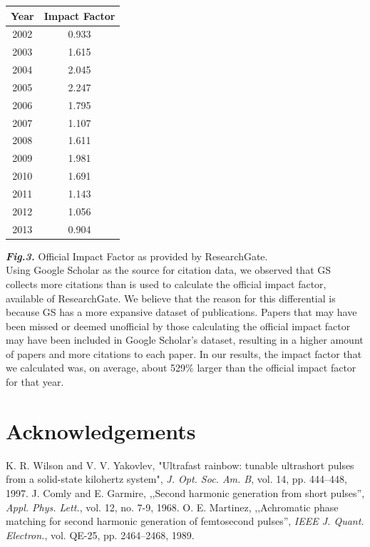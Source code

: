 \documentclass[times]{jtitauth}
\begin{document}
\begin{center}
\begin{tabular}{| c | c |} 
 \hline
 Year & Impact Factor\\ 
 \hline\hline
 2002 &  0.933\\ 
 \hline
 2003 &  1.615\\
 \hline
 2004 &  2.045\\
 \hline
 2005 &  2.247\\
 \hline
 2006 &  1.795\\ 
 \hline
 2007 &  1.107\\ 
 \hline
 2008 &  1.611\\ 
 \hline
 2009 &  1.981\\ 
 \hline
 2010 &  1.691\\ 
 \hline
 2011 &  1.143\\ 
 \hline
 2012 &  1.056\\ 
 \hline
 2013 &  0.904\\ 
 \hline
\end{tabular}
\end{center}
\textbf{\textit{Fig.3.}}\hspace{.1cm} Official Impact Factor as provided by ResearchGate.\\


Using Google Scholar as the source for citation data, we observed that GS collects more citations than is used to calculate the official impact factor, available of ResearchGate. We believe that the reason for this differential is because GS has a more expansive dataset of publications. Papers that may have been missed or deemed unofficial by those calculating the official impact factor may have been included in Google Scholar's dataset, resulting in a higher amount of papers and more citations to each paper. In our results, the impact factor that we calculated was, on average, about 529\% larger than the official impact factor for that year. 



\section*{Acknowledgements}


\begin{thebibliography}{99}
K. R. Wilson and V. V. Yakovlev, "Ultrafast rainbow: tunable ultrashort
 pulses from a solid-state kilohertz system", {\it J. Opt. Soc. Am. B}, vol. 14, pp. 444--448, 1997.
J. Comly and E. Garmire, ,,Second harmonic generation from short
pulses'', {\it Appl. Phys. Lett.}, vol. 12, no. 7-9, 1968.
O. E. Martinez, ,,Achromatic phase matching for second harmonic ge\-neration
of femtosecond pulses'', {\it IEEE J. Quant. Electron.}, vol.
QE-25, pp. 2464--2468, 1989.

\end{thebibliography}
\end{document}
